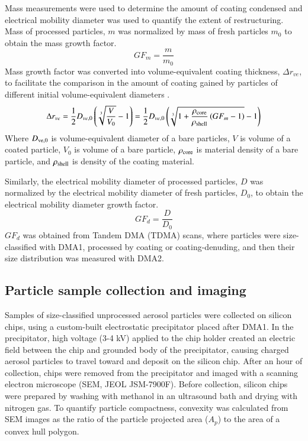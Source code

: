 Mass measurements were used to determine the amount of coating condensed and electrical mobility diameter was used to quantify the extent of restructuring. Mass of processed particles, $m$ was normalized by mass of fresh particles $m_0$ to obtain the mass growth factor.
\begin{equation}
GF_m=\frac{m}{m_0}
\label{eq:gfm}
\end{equation}
Mass growth factor was converted into volume-equivalent coating thickness, $\Delta r_{ve}$, to facilitate the comparison in the amount of coating gained by particles of different initial volume-equivalent diameters \citep{RN37}.
\begin{equation}
\Delta r_{ve}=\frac{1}{2}D_{ve,0}\left(\sqrt[3]{\frac{V}{V_0}}-1\right)=
\frac{1}{2}D_{ve,0}\left(\sqrt[3]{1+\frac{\rho_{\rm core}}{\rho_{\rm shell}}\left(GF_m-1\right)}-1\right)
\label{eq:drve}
\end{equation}
Where $D_{\rm ve,0}$ is volume-equivalent diameter of a bare particles, $V$ is volume of a coated particle, $V_0$ is volume of a bare particle, $\rho_{\rm core}$ is material density of a bare particle, and $\rho_{\rm shell}$ is density of the coating material.

Similarly, the electrical mobility diameter of processed particles, $D$ was normalized by the electrical mobility diameter of fresh particles, $D_0$, to obtain the electrical mobility diameter growth factor.
\begin{equation}
GF_d=\frac{D}{D_0}
\label{eq:gfd}
\end{equation}
$GF_{d}$ was obtained from Tandem DMA (TDMA) scans, where particles were size-classified with DMA1, processed by coating or coating-denuding, and then their size distribution was measured with DMA2.

\subsection{Particle sample collection and imaging}

Samples of size-classified unprocessed aerosol particles were collected on silicon chips, using a custom-built electrostatic precipitator \citep{RN17,RN16} placed after DMA1. In the precipitator, high voltage (3-4 kV) applied to the chip holder created an electric field between the chip and grounded body of the precipitator, causing charged aerosol particles to travel toward and deposit on the silicon chip. After an hour of collection, chips were removed from the precipitator and imaged with a scanning electron microscope (SEM, JEOL JSM-7900F). Before collection, silicon chips were prepared by washing with methanol in an ultrasound bath and drying with nitrogen gas. To quantify particle compactness, convexity was calculated from SEM images as the ratio of the particle projected area ($A_p$) to the area of a convex hull polygon.

